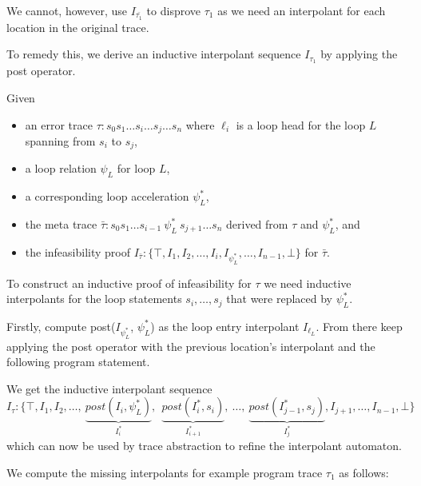 \documentclass{article}
\newcommand{\loc}[1]{\ensuremath{\ell_{#1}}\xspace}
\newcounter{example}[section]
\newcommand\mycom[1]{}
\newcommand\mycom[1]{#1}
\newcommand{\dd}[1]{\mycom{\todo[color=orange!40,inline]{\small DD: #1}}}
\newcommand{\ts}[1]{\mycom{\todo[color=green!40,inline]{\small TS: #1}}}
\begin{document}
\dd{Do you still need the line above?}

We cannot, however, use $I_{\bar{\tau_1}}$ to disprove $\tau_1$ as we need an interpolant for each location in the original trace.
\dd{say which one is missing ;)}
To remedy this, we derive an inductive interpolant sequence $I_{\tau_1}$ by applying the post operator.
\dd{Explain why we need post for the before-location, use the example here}

\newcommand{\accels}[1]{\ensuremath{\psi^{*}_{#1}}}
Given
\begin{itemize}[topsep=0pt,itemsep=-1ex,partopsep=1ex,parsep=1ex]
	\item an error trace $\tau: s_0 s_1 \ldots s_i \ldots s_j \ldots s_n$ where \loc{i} is a loop head for the loop $L$ spanning from $s_i$ to $s_j$,
	\item a loop relation $\psi_L$ for loop $L$,
	\item a corresponding loop acceleration \accels{L},
	\item the meta trace $\bar{\tau}: s_0 s_1 \ldots s_{i-1} \ \accels{L} \ s_{j+1} \ldots s_n$ derived from $\tau$ and \accels{L}, and
	\item the infeasibility proof $I_{\bar{\tau}}: \{\top, I_1, I_2, \ldots , I_i, I_{\psi^*_{L}}, \ldots , I_{n-1}, \bot \}$ for $\bar{\tau}$.
\end{itemize}
\dd{Fix indices s.t. we have the interpolant (sic!) before and after the loop acceleration}

To construct an inductive proof of infeasibility for $\tau$ we need inductive interpolants for the loop statements $s_i, \ldots , s_j$ that were replaced by $\psi^*_{L}$.

Firstly, compute post($I_{\psi^*_L}$, $\psi^*_L$) as the loop entry interpolant $I_{\loc{L}}$.
From there keep applying the post operator with the previous location's interpolant and the following program statement.

We get the inductive interpolant sequence
\begin{equation*}
	I_\tau: \{\top,I_1,I_2, \ldots ,\ \underbrace{post(I_i, \accels{L})}_{I_{i}^*},\ \ \underbrace{post(I_{i}^*, s_i)}_{I_{i+1}^*},\ \ldots ,\ \underbrace{post(I_{j-1}^*, s_j)}_{I_{j}^*},I_{j+1}, \ldots ,I_{n-1}, \bot \}
\end{equation*}
which can now be used by trace abstraction to refine the interpolant automaton.
\ts{Explain why this works and why it is necessary.}

We compute the missing interpolants for example program trace $\tau_1$ as follows:
\dd{Strange wording. This is just the continuaton of the example, right?}
\begin{comment}
\begin{figure}[H]
	\centering
	
	\captionof{figure}{Program trace $\tau_1$ of $P_1$ with inductive infeasibility proof.}
\end{figure}
\end{comment}
\end{document}
